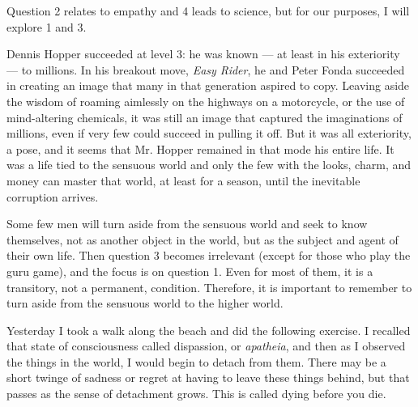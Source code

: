 Question 2 relates to empathy and 4 leads to science, but for our purposes, I will explore 1 and 3.

Dennis Hopper succeeded at level 3: he was known --- at least in his exteriority --- to millions. In his breakout move, \emph{Easy Rider}, he and Peter Fonda succeeded in creating an image that many in that generation aspired to copy. Leaving aside the wisdom of roaming aimlessly on the highways on a motorcycle, or the use of mind-altering chemicals, it was still an image that captured the imaginations of millions, even if very few could succeed in pulling it off. But it was all exteriority, a pose, and it seems that Mr. Hopper remained in that mode his entire life. It was a life tied to the sensuous world and only the few with the looks, charm, and money can master that world, at least for a season, until the inevitable corruption arrives.

Some few men will turn aside from the sensuous world and seek to know themselves, not as another object in the world, but as the subject and agent of their own life. Then question 3 becomes irrelevant (except for those who play the guru game), and the focus is on question 1. Even for most of them, it is a transitory, not a permanent, condition. Therefore, it is important to remember to turn aside from the sensuous world to the higher world.

Yesterday I took a walk along the beach and did the following exercise. I recalled that state of consciousness called dispassion, or \emph{apatheia}, and then as I observed the things in the world, I would begin to detach from them. There may be a short twinge of sadness or regret at having to leave these things behind, but that passes as the sense of detachment grows. This is called dying before you die.



